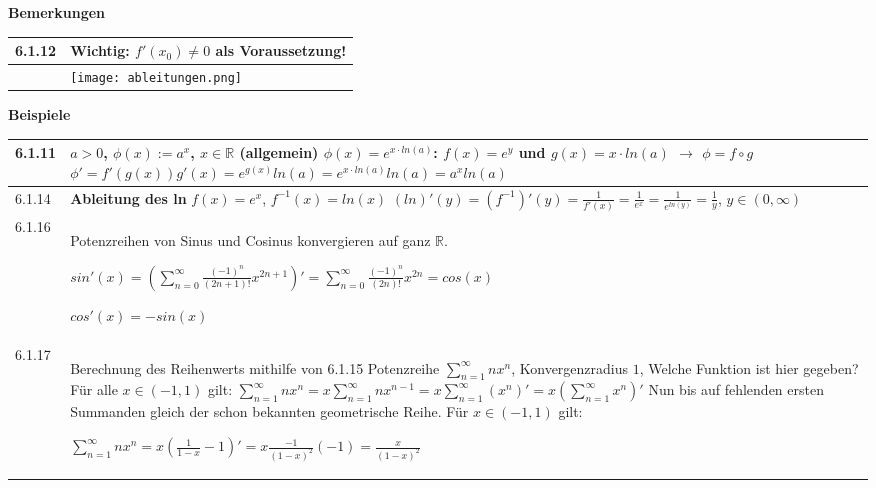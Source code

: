     \noindent
    \textbf{Bemerkungen}
    \begin{table}[H]
    \begin{tabularx}{\textwidth}{X m{16cm}}
        \toprule

        6.1.12& Wichtig: $f'(x_0) \neq 0$ als Voraussetzung! \\
        \midrule
              & \texttt{[image: ableitungen.png]} \\
        \bottomrule
    \end{tabularx}
    \end{table}

    \noindent
    \textbf{Beispiele}
    \begin{table}[H]
    \begin{tabularx}{\textwidth}{X m{16cm}}
        \toprule

        6.1.11& $a > 0$, $\phi(x):= a^x$, $x \in \mathbb{R}$ (allgemein) \hfill \break
                $\phi(x) = e^{x\cdot ln(a)}$: $f(x) = e^y$ und $g(x) = x\cdot ln(a)$ $\rightarrow$ $\phi = f\circ g$ \hfill \break
                $\phi' = f'(g(x))g'(x) = e^{g(x)}ln(a) = e^{x\cdot ln(a)}ln(a) = a^xln(a)$ \\
        \midrule
        6.1.14& \textbf{Ableitung des ln} \hfill \break
                $f(x) = e^x$, $f^{-1}(x) = ln(x)$ \hfill \break
                $(ln)'(y) = (f^{-1})'(y) = \frac{1}{f'(x)} = \frac{1}{e^x} = \frac{1}{e^{ln(y)}} = \frac{1}{y}$, $y \in (0, \infty)$ \\
        \midrule
        6.1.16& Potenzreihen von Sinus und Cosinus konvergieren auf ganz $\mathbb{R}$. \hfill \break
                \centerline{$ sin'(x) = (\sum^{\infty}_{n=0} \frac{(-1)^n}{(2n+1)!} x^{2n+1})' = 
                \sum^{\infty}_{n=0} \frac{(-1)^n}{(2n)!}x^{2n} = cos(x)$}
                \centerline{$cos'(x) = -sin(x)$} \\
        \midrule
        6.1.17& Berechnung des Reihenwerts mithilfe von 6.1.15 \hfill \break
                Potenzreihe $\sum^{\infty}_{n=1} nx^n$, Konvergenzradius $1$, Welche Funktion ist hier gegeben? \hfill \break
                Für alle $x\in (-1,1)$ gilt: $\sum^{\infty}_{n=1} nx^n = x \sum^{\infty}_{n=1} nx^{n-1} =
                x \sum^{\infty}_{n=1} (x^n)' = x(\sum^{\infty}_{n=1} x^n)'$ \hfill \break
                Nun bis auf fehlenden ersten Summanden gleich der schon bekannten geometrische Reihe. Für $x \in (-1,1)$ gilt: \hfill \break
                \centerline{$ \sum^{\infty}_{n=1} nx^n = x( \frac{1}{1-x} - 1)' = x \frac{-1}{(1-x)^2}(-1) = \frac{x}{(1-x)^2} $} \\
        
        \bottomrule
    \end{tabularx}
    \end{table}

